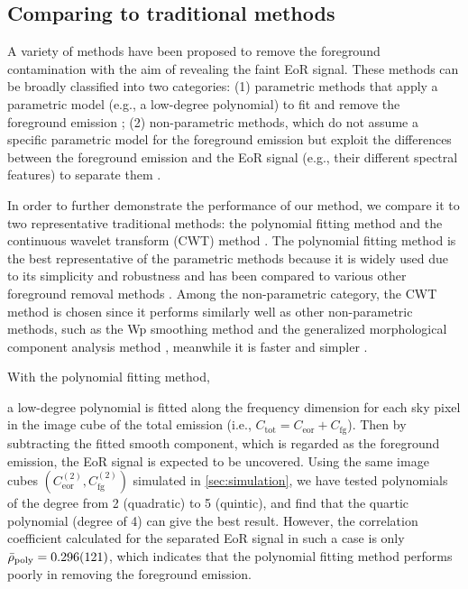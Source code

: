 \documentclass[fleqn,usenatbib]{mnras}
\newcommand{\R}[1]{\mathrm{#1}}
\newcommand{\editone}[1]{{\leavevmode\color{cyan}#1}}
\begin{document}
\editone{%
\subsection{Comparing to traditional methods}
\label{sec:comparisons}

A variety of methods have been proposed to remove the foreground
contamination with the aim of revealing the faint EoR signal.
These methods can be broadly classified into two categories:
(1) parametric methods that apply a parametric model (e.g., a low-degree
polynomial) to fit and remove the foreground emission
\citep[e.g.,][]{wang2006,jelic2008,liu2009fgrm,wang2013,bonaldi2015};
(2) non-parametric methods, which do not assume a specific parametric model
for the foreground emission but exploit the differences between the
foreground emission and the EoR signal (e.g., their different spectral
features) to separate them
\citep[e.g.,][]{harker2009,chapman2012,chapman2013,gu2013,mertens2018}.

In order to further demonstrate the performance of our method, we compare
it to two representative traditional methods:
the polynomial fitting method \citep[e.g.,][]{wang2006} and
the continuous wavelet transform (CWT) method \citep{gu2013}.
The polynomial fitting method is the best representative of the parametric
methods because it is widely used due to its simplicity and robustness
\citep[e.g.,][]{jelic2008,liu2009ps,pritchard2010}
and has been compared to various other foreground removal methods
\citep[e.g.,][]{harker2009,alonso2015,chapman2015}.
Among the non-parametric category, the CWT method is chosen since it
performs similarly well as other non-parametric methods, such as the
Wp smoothing method \citep{harker2009} and the generalized morphological
component analysis method \citep{chapman2013},
meanwhile it is faster and simpler \citep{gu2013,chapman2015}.

With the polynomial fitting method,} %
a low-degree polynomial is fitted along the frequency dimension for each
sky pixel in the image cube of the total emission (i.e.,
$C_{\R{tot}} = C_{\R{eor}} + C_{\R{fg}}$).
Then by subtracting the fitted smooth component, which is regarded as
the foreground emission, the EoR signal is expected to be uncovered.
\editone{Using the same image cubes
\editone{$\left( C_{\R{eor}}^{(2)}, C_{\R{fg}}^{(2)} \right)$}
simulated in \autoref{sec:simulation},} %
we have tested polynomials of the degree from 2 (quadratic) to
5 (quintic), and find that the quartic polynomial (degree of 4)
can give the best result.
However, the correlation coefficient calculated for the separated EoR
signal in such a case is only
\editone{$\bar{\rho}_{\R{poly}} = \num{0.296 +- 0.121}$},
which indicates that the polynomial fitting method performs poorly in
removing the foreground emission.
\end{document}
